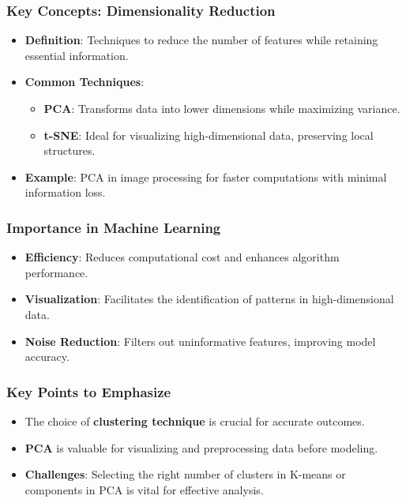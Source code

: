\documentclass[aspectratio=169]{beamer}
\begin{document}
\begin{frame}[fragile]
    \frametitle{Key Concepts: Dimensionality Reduction}
    \begin{itemize}
        \item \textbf{Definition}: Techniques to reduce the number of features while retaining essential information.
        \item \textbf{Common Techniques}:
        \begin{itemize}
            \item \textbf{PCA}: Transforms data into lower dimensions while maximizing variance.
            \item \textbf{t-SNE}: Ideal for visualizing high-dimensional data, preserving local structures.
        \end{itemize}
        \item \textbf{Example}: PCA in image processing for faster computations with minimal information loss.
    \end{itemize}
\end{frame}

\begin{frame}[fragile]
    \frametitle{Importance in Machine Learning}
    \begin{itemize}
        \item \textbf{Efficiency}: Reduces computational cost and enhances algorithm performance.
        \item \textbf{Visualization}: Facilitates the identification of patterns in high-dimensional data.
        \item \textbf{Noise Reduction}: Filters out uninformative features, improving model accuracy.
    \end{itemize}
\end{frame}

\begin{frame}[fragile]
    \frametitle{Key Points to Emphasize}
    \begin{itemize}
        \item The choice of \textbf{clustering technique} is crucial for accurate outcomes.
        \item \textbf{PCA} is valuable for visualizing and preprocessing data before modeling.
        \item \textbf{Challenges}: Selecting the right number of clusters in K-means or components in PCA is vital for effective analysis.
    \end{itemize}
\end{frame}
\end{document}
